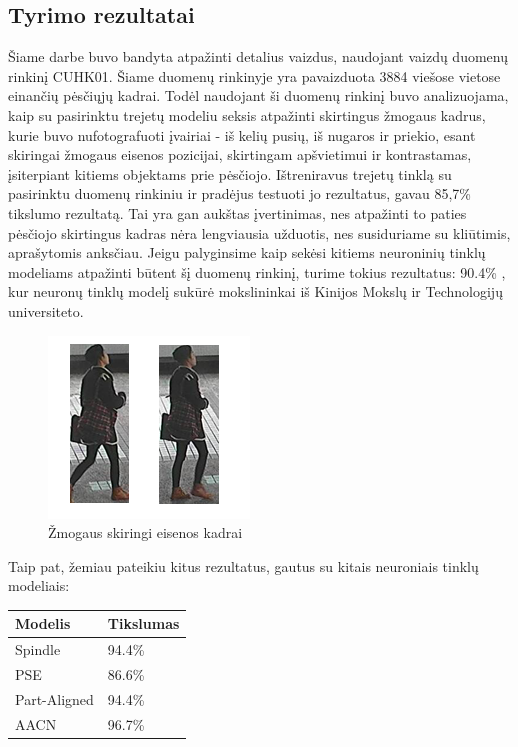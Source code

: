 \documentclass{VUMIFPSkursinis}
\DeclareRobustCommand{\[}{\begin{equation}}
\DeclareRobustCommand{\]}{\end{equation}}
\begin{document}
\subsection{Tyrimo rezultatai}
Šiame darbe buvo bandyta atpažinti detalius vaizdus, naudojant vaizdų duomenų rinkinį CUHK01. Šiame duomenų rinkinyje yra pavaizduota 3884 viešose vietose einančių pėsčiųjų kadrai. Todėl naudojant ši duomenų rinkinį buvo analizuojama, kaip su pasirinktu trejetų modeliu seksis atpažinti skirtingus žmogaus kadrus, kurie buvo nufotografuoti įvairiai -  iš kelių pusių, iš nugaros ir priekio, esant skiringai žmogaus eisenos pozicijai, skirtingam apšvietimui ir kontrastamas, įsiterpiant kitiems objektams prie pėsčiojo.
\newline
Ištreniravus trejetų tinklą su pasirinktu duomenų rinkiniu ir pradėjus testuoti jo rezultatus, gavau 85,7\% tikslumo rezultatą. Tai yra gan aukštas įvertinimas, nes atpažinti to paties pėsčiojo skirtingus kadras nėra lengviausia užduotis, nes susiduriame su kliūtimis, aprašytomis anksčiau. Jeigu palyginsime kaip sekėsi kitiems neuroninių tinklų modeliams atpažinti būtent šį duomenų rinkinį, turime tokius rezultatus:
90.4\% , kur neuronų tinklų modelį sukūrė mokslininkai iš Kinijos Mokslų ir Technologijų universiteto. \cite{Person_reindentification}
\begin{figure}[H]
\centering
\includegraphics[scale=1.0]{img/Frame_diff.png}
\caption{Žmogaus skiringi eisenos kadrai} %
\label{img:mlp}
\end{figure}
Taip pat, žemiau pateikiu kitus rezultatus, gautus su kitais neuroniais tinklų modeliais:

\begin{center}
\begin{tabular}{ | m{7em} | m{5em}| } 
\hline
Modelis & Tikslumas \\
\hline
Spindle & 94.4\% \\
\hline
PSE & 86.6\% \\
\hline
Part-Aligned& 94.4\% \\
\hline
AACN & 96.7\% \\
\hline
\end{tabular}
\end{center}
\end{document}
